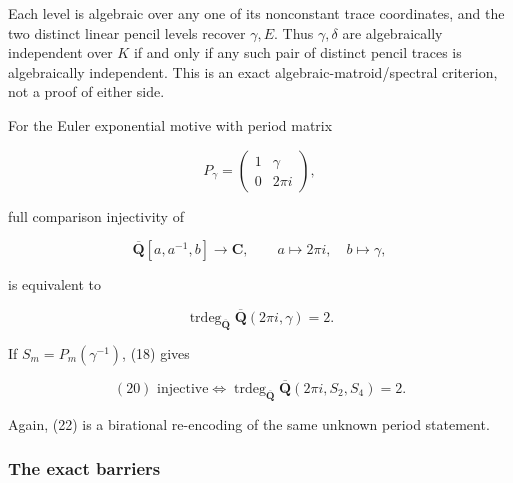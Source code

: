 Each level is algebraic over any one of its nonconstant trace coordinates,
and the two distinct linear pencil levels recover \(\gamma,E\). Thus
\(\gamma,\delta\) are algebraically independent over \(K\) if and only if
any such pair of distinct pencil traces is algebraically independent. This
is an exact algebraic-matroid/spectral criterion, not a proof of either side.

For the Euler exponential motive with period matrix

\[
 P_\gamma=\begin{pmatrix}1&\gamma\\0&2\pi i\end{pmatrix},
\]

full comparison injectivity of

\[
 \overline{\mathbf Q}[a,a^{-1},b]\longrightarrow\mathbf C,
 \qquad a\mapsto2\pi i,\quad b\mapsto\gamma,                              \tag{GT-20}
\]

is equivalent to

\[
 \operatorname{trdeg}_{\overline{\mathbf Q}}
 \overline{\mathbf Q}(2\pi i,\gamma)=2.                                   \tag{GT-21}
\]

If \(S_m=P_m(\gamma^{-1})\), (18) gives

\[
 \boxed{
 (20)\text{ injective}
 \iff
 \operatorname{trdeg}_{\overline{\mathbf Q}}
 \overline{\mathbf Q}(2\pi i,S_2,S_4)=2.}                                 \tag{GT-22}
\]

Again, (22) is a birational re-encoding of the same unknown period
statement.

\subsubsection{The exact barriers}

